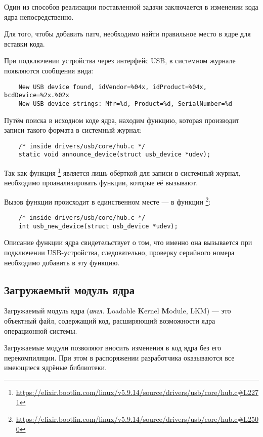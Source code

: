 Один из способов реализации поставленной задачи заключается в изменении кода ядра непосредственно.

Для того, чтобы добавить патч, необходимо найти правильное место в ядре для вставки кода.

При подключении устройства через интерфейс USB, в системном журнале появляются сообщения вида:
\verbatimfont{\footnotesize}
\begin{verbatim}
	New USB device found, idVendor=%
	New USB device strings: Mfr=%
\end{verbatim}

Путём поиска в исходном коде ядра, находим функцию, которая производит записи такого формата в системный журнал:
\verbatimfont{\small}
\begin{verbatim}
	/* inside drivers/usb/core/hub.c */
	static void announce_device(struct usb_device *udev);
\end{verbatim}

Так как функция \footnote{\url{https://elixir.bootlin.com/linux/v5.9.14/source/drivers/usb/core/hub.c\#L2271}} является лишь обёрткой для записи в системный журнал, необходимо проанализировать функции, которые её вызывают.

Вызов функции  происходит в единственном месте — в функции \footnote{\url{https://elixir.bootlin.com/linux/v5.9.14/source/drivers/usb/core/hub.c\#L2500}}:
\begin{verbatim}
	/* inside drivers/usb/core/hub.c */
	int usb_new_device(struct usb_device *udev);
\end{verbatim}

Описание функции ядра  свидетельствует о том, что именно она вызывается при подключении USB-устройства, следовательно, проверку серийного номера необходимо добавить в эту функцию.

\subsection{Загружаемый модуль ядра}

Загружаемый модуль ядра (\textit{англ.} \textbf{L}oadable \textbf{K}ernel \textbf{M}odule, LKM) — это объектный файл, содержащий код, расширяющий возможности ядра операционной системы.

Загружаемые модули позволяют вносить изменения в код ядра без его перекомпиляции.
При этом в распоряжении разработчика оказываются все имеющиеся ядрёные библиотеки.

